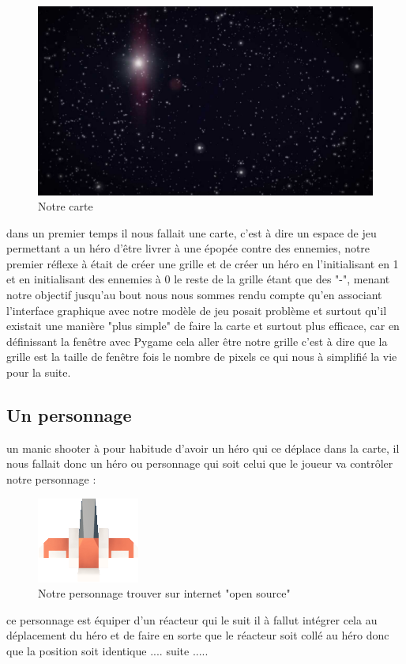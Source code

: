 \documentclass[a4paper, 11pt]{article}
\begin{document}
 	\begin{figure}[ht!]
\centering
\includegraphics[width=0.8\linewidth]{Background.jpg}
\caption{Notre carte}
\end{figure}
 	dans un premier temps il nous fallait une carte, c'est à dire un espace de jeu permettant a un héro d'être livrer à une épopée contre des ennemies,
 	notre premier réflexe à était de créer une grille et de créer un héro en l'initialisant en 1 et en initialisant des ennemies à 0 le reste de la grille étant que des "-", menant notre objectif jusqu'au bout nous nous sommes rendu compte qu'en associant l'interface graphique avec notre modèle de jeu posait problème et surtout qu'il existait une manière "plus simple" de faire la carte et surtout plus efficace, car en définissant la fenêtre avec Pygame cela aller être notre grille c'est à dire que la grille est la taille de fenêtre fois le nombre de pixels ce qui nous à simplifié la vie pour la suite.

 	
	\subsection{Un personnage}
un manic shooter à pour habitude d'avoir un héro qui ce déplace dans la carte, il nous fallait donc un héro ou personnage qui soit celui que le joueur va contrôler notre personnage :
\begin{figure}[ht!]
\centering
\includegraphics[width=0.1\linewidth]{spaceCraft1.png}
\caption{Notre personnage trouver sur internet "open source"}
\end{figure}
ce personnage est équiper d'un réacteur qui le suit il à fallut intégrer cela au déplacement du héro et de faire en sorte que le réacteur soit collé au héro donc que la position soit identique .... suite .....
\end{document}
